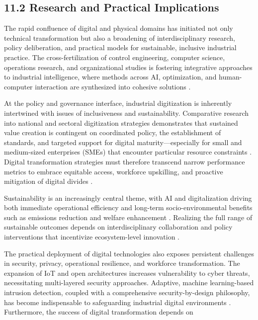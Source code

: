 \documentclass[11pt]{article}
\begin{document}
\subsection{11.2 Research and Practical Implications}

The rapid confluence of digital and physical domains has initiated not only technical transformation but also a broadening of interdisciplinary research, policy deliberation, and practical models for sustainable, inclusive industrial practice. The cross-fertilization of control engineering, computer science, operations research, and organizational studies is fostering integrative approaches to industrial intelligence, where methods across AI, optimization, and human-computer interaction are synthesized into cohesive solutions \cite{ref41}\cite{ref86}.

At the policy and governance interface, industrial digitization is inherently intertwined with issues of inclusiveness and sustainability. Comparative research into national and sectoral digitization strategies demonstrates that sustained value creation is contingent on coordinated policy, the establishment of standards, and targeted support for digital maturity—especially for small and medium-sized enterprises (SMEs) that encounter particular resource constraints \cite{ref21}\cite{ref23}. Digital transformation strategies must therefore transcend narrow performance metrics to embrace equitable access, workforce upskilling, and proactive mitigation of digital divides \cite{ref91}.

Sustainability is an increasingly central theme, with AI and digitalization driving both immediate operational efficiency and long-term socio-environmental benefits such as emissions reduction and welfare enhancement \cite{ref90}. Realizing the full range of sustainable outcomes depends on interdisciplinary collaboration and policy interventions that incentivize ecosystem-level innovation \cite{ref88}.

The practical deployment of digital technologies also exposes persistent challenges in security, privacy, operational resilience, and workforce transformation. The expansion of IoT and open architectures increases vulnerability to cyber threats, necessitating multi-layered security approaches. Adaptive, machine learning-based intrusion detection, coupled with a comprehensive security-by-design philosophy, has become indispensable to safeguarding industrial digital environments \cite{ref10}\cite{ref92}. Furthermore, the success of digital transformation depends on
\end{document}
